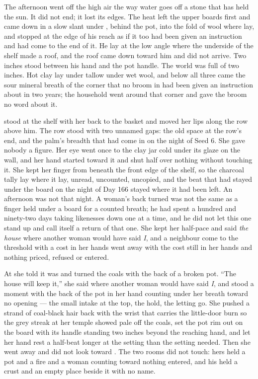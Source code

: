 The afternoon went off the high air the way water goes off a stone that has held the sun. It did not end; it lost its edges. The heat left the upper boards first and came down in a slow slant under , behind the pot, into the fold of wool where  lay, and stopped at the edge of his reach as if it too had been given an instruction and had come to the end of it. He lay at the low angle where the underside of the shelf made a roof, and the roof came down toward him and did not arrive. Two inches stood between his hand and the pot handle. The world was full of two inches. Hot clay lay under tallow under wet wool, and below all three came the sour mineral breath of the corner that no broom in  had been given an instruction about in two years; the household went around that corner and gave the broom no word about it.

 stood at the shelf with her back to the basket and moved her lips along the row above him. The row stood with two unnamed gaps: the old space at the row's end, and the palm's breadth that had come in on the night of Seed 6. She gave nobody a figure. Her eye went once to the clay jar cold under its glaze on the wall, and her hand started toward it and shut half over nothing without touching it. She kept her finger from beneath the front edge of the shelf, so the charcoal tally lay where it lay, unread, uncounted, uncopied, and the beat that had stayed under the board on the night of Day 166 stayed where it had been left. An afternoon was not that night. A woman's back turned was not the same as a finger held under a board for a counted breath; he had spent a hundred and ninety-two days taking likenesses down one at a time, and he did not let this one stand up and call itself a return of that one. She kept her half-pace and said \emph{the house} where another woman would have said \emph{I}, and a neighbour come to the threshold with a cost in her hands went away with the cost still in her hands and nothing priced, refused or entered.

At  she told  it was  and turned the coals with the back of a broken pot. “The house will keep it,” she said where another woman would have said \emph{I}, and stood a moment with the back of the pot in her hand counting under her breath toward no opening --- the small intake at the top, the hold, the letting go. She pushed a strand of coal-black hair back with the wrist that carries the little-door burn so the grey streak at her temple showed pale off the coals, set the pot rim out on the board with its handle standing two inches beyond the reaching hand, and let her hand rest a half-beat longer at the setting than the setting needed. Then she went away and did not look toward . The two rooms did not touch: hers held a pot and a fire and a woman counting toward nothing entered, and his held a crust and an empty place beside it with no name.

